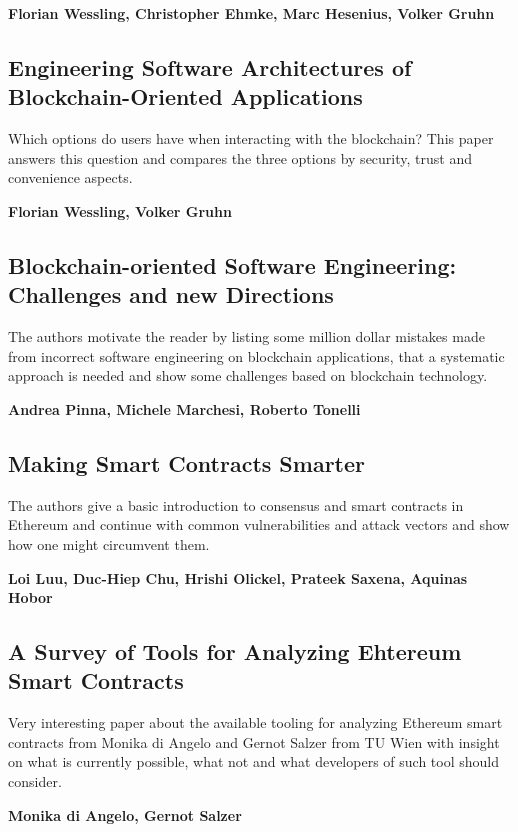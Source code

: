 \textbf{Florian Wessling, Christopher Ehmke, Marc Hesenius, Volker Gruhn}~\cite{how_much_blockchain_do_you_need}

\subsection{Engineering Software Architectures of Blockchain-Oriented Applications}
Which options do users have when interacting with the blockchain? This paper answers this question and compares the three options by security, trust and convenience aspects.

\textbf{Florian Wessling, Volker Gruhn}~\cite{engineering_software_architectures_of_BO_Apps}

\subsection{Blockchain-oriented Software Engineering: Challenges and new Directions}
The authors motivate the reader by listing some million dollar mistakes made from incorrect software engineering on blockchain applications, that a systematic approach is needed and show some challenges based on blockchain technology.

\textbf{Andrea Pinna, Michele Marchesi, Roberto Tonelli}~\cite{blockchain_oriented_software_engineering}

\subsection{Making Smart Contracts Smarter}
The authors give a basic introduction to consensus and smart contracts in Ethereum and continue with common vulnerabilities and attack vectors and show how one might circumvent them.

\textbf{Loi Luu, Duc-Hiep Chu, Hrishi Olickel, Prateek Saxena, Aquinas Hobor}~\cite{making_smart_contracts_smarter}

\subsection{A Survey of Tools for Analyzing Ehtereum Smart Contracts}
Very interesting paper about the available tooling for analyzing Ethereum smart contracts from Monika di Angelo and Gernot Salzer from TU Wien with insight on what is currently possible, what not and what developers of such tool should consider.

\textbf{Monika di Angelo, Gernot Salzer}~\cite{tools_for_analyzing_smart_contracts}
